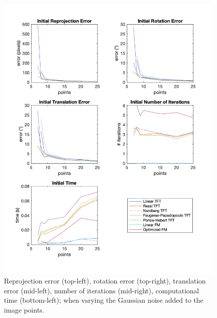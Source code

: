\begin{figure}[p]
	\centering
	\includegraphics[width=1\textwidth]{Experiments/Synthetic/points/INITpointsPlots.png}
	\caption{Reprojection error (top-left), rotation error (top-right), translation error (mid-left), number of iterations (mid-right), computational time (bottom-left); when varying the Gaussian noise added to the image points.}
\end{figure}

